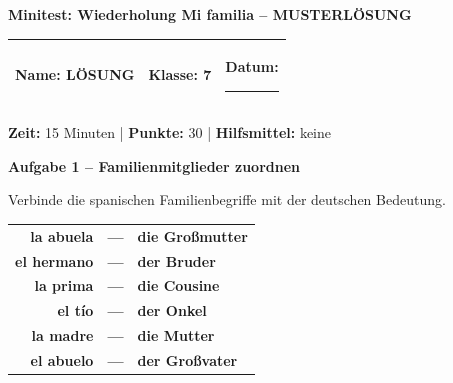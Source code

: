 \documentclass[11pt, a4paper]{article}
\newcommand{\fachfarbe}{spanisch}
\newcommand{\thema}{Minitest: Wiederholung Mi familia -- MUSTERLÖSUNG}
\newcommand{\klasse}{7}
\newcommand{\maxpunkte}{30}
\newcommand{\zeit}{15 Minuten}
\newcommand{\punktebox}[1]{\hfill\fbox{\small \_/#1}}
\newcommand{\luecke}[1]{\rule{#1}{0.4pt}}
\newcommand{\lsg}[1]{\textcolor{loesung}{\textbf{#1}}}
\newenvironment{aufgabe}[1]{%
    \needspace{5\baselineskip}%
    \nopagebreak[4]%
    \vspace{10pt}
    \noindent\textbf{\textcolor{\fachfarbe}{Aufgabe #1}}
    \nopagebreak[4]%
    \vspace{5pt}
    \nopagebreak[4]%
    \begin{list}{}{\leftmargin=0pt}
    \item[]
}{%
    \end{list}
}
\newcommand{\es}[1]{\textcolor{\fachfarbe}{\textbf{#1}}}
\begin{document}

\begin{center}
    {\Large\bfseries\textcolor{\fachfarbe}{\thema}}
\end{center}

\vspace{5pt}

\noindent
\begin{tabularx}{\textwidth}{|X|X|X|}
\hline
\textbf{Name:} \lsg{LÖSUNG} &
\textbf{Klasse:} \klasse &
\textbf{Datum:} \luecke{2cm} \\
\hline
\end{tabularx}

\vspace{10pt}

\begin{infobox}
\textbf{Zeit:} \zeit{} | \textbf{Punkte:} \maxpunkte{} | \textbf{Hilfsmittel:} keine
\end{infobox}

\vspace{15pt}


\begin{aufgabe}{1 -- Familienmitglieder zuordnen}
Verbinde die spanischen Familienbegriffe mit der deutschen Bedeutung. \punktebox{6}
\end{aufgabe}

\begin{center}
\begin{tabular}{rcl}
\es{la abuela} & \lsg{---} & \lsg{die Großmutter} \\[0.8em]
\es{el hermano} & \lsg{---} & \lsg{der Bruder} \\[0.8em]
\es{la prima} & \lsg{---} & \lsg{die Cousine} \\[0.8em]
\es{el tío} & \lsg{---} & \lsg{der Onkel} \\[0.8em]
\es{la madre} & \lsg{---} & \lsg{die Mutter} \\[0.8em]
\es{el abuelo} & \lsg{---} & \lsg{der Großvater} \\
\end{tabular}
\end{center}

\vspace{15pt}
\end{document}
